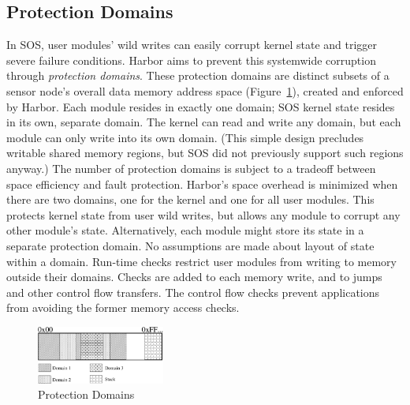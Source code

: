 % 
% 
% 
% 
% 
% 
% 
% 
% 
\subsection{Protection Domains}
% 
In SOS, user modules' wild writes can easily corrupt kernel state
and trigger severe failure conditions.
% 
Harbor aims to prevent this systemwide corruption through \emph{protection domains}.
% 
% 
% 
These protection domains are
% 
distinct subsets of a sensor node's overall data memory address space
(Figure~\ref{fig:prot_domains}), created and enforced by Harbor.
% 
Each module resides in exactly one domain; SOS kernel state resides in
its own, separate domain.
% 
The kernel can read and write any domain, but each module can only write
into its own domain.
% 
(This simple design precludes writable shared memory regions, but SOS did
not previously support such regions anyway.)
% 
The number of protection domains is subject to a tradeoff between space
efficiency and fault protection.
%
Harbor's space overhead is minimized when there are two domains, one
for the kernel and one for all user modules.
%
This protects kernel state from user wild writes, but allows any
module to corrupt any other module's state.
%
Alternatively, each module might store its state in a separate
protection domain.
% 
No assumptions are made about layout of state within a domain.
% 
Run-time checks restrict user modules from writing to memory outside
their domains.
% 
Checks are added to each memory write, and to jumps and other control
flow transfers.  
%
The control flow checks prevent applications from avoiding the former memory access
checks.
\begin{figure}[htbp]
  \centering
  \includegraphics[height = 0.75in,
  keepaspectratio=true]{figures/domains.eps} 
  \caption{Protection Domains}
  \label{fig:prot_domains}
\end{figure}


